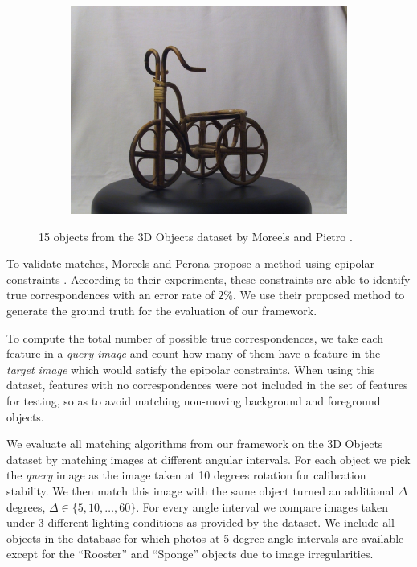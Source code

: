 \documentclass[runningheads]{llncs}
\begin{document}
\begin{figure}[htb]
\begin{subfigure}[t]{0.15\columnwidth}
        \includegraphics[width=1\columnwidth]{images/3d/15}
    \end{subfigure}%
    \vspace{1.5 mm}

    \caption{15 objects from the 3D Objects dataset by Moreels
    and Pietro \cite{moreels2007evaluation}.}
    \label{fig:3d_objects}
\end{figure}

To validate matches, Moreels and Perona propose a method using epipolar constraints \cite[p.266]{moreels2007evaluation}.  According to their experiments, these constraints are able to identify true correspondences with an error rate of $2\%$. We use their proposed method to generate the ground truth for the evaluation of our framework.

To compute the total number of possible true correspondences, we take each feature in a \emph{query image} and count how many of them have a feature in the \emph{target image} which would satisfy the epipolar constraints. When using this dataset, features with no correspondences were not included in the set of features for testing, so as to avoid matching non-moving background and foreground objects.

We evaluate all matching algorithms from our framework on the 3D Objects dataset by matching images at different angular intervals. For each object we pick the \emph{query} image as the image taken at 10 degrees rotation for calibration stability.  We then match this image with the same object turned an additional $\Delta$ degrees, $\Delta \in \{5, 10, \ldots, 60\}$.  For every angle interval we compare images taken under 3 different lighting conditions as provided by the dataset. We include all objects in the database for which photos at 5 degree angle intervals are available except for the ``Rooster'' and ``Sponge'' objects due to image irregularities.
\end{document}
